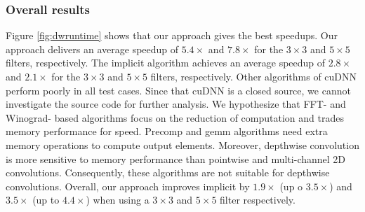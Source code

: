 \subsubsection{Overall results}
Figure \ref{fig:dwruntime} shows that our approach gives the best speedups. 
Our approach delivers an average speedup of $5.4\times$ and $7.8\times$ for the $3 \times 3$ and $5 \times 5$ filters, respectively. 
The implicit algorithm achieves an average speedup of $2.8\times$ and $2.1\times$ for the $3 \times 3$ and $5 \times 5$ filters, respectively.
Other algorithms of cuDNN perform poorly in all test cases. 
Since that cuDNN is a closed source, we cannot investigate the source code for further analysis. 
We hypothesize that FFT- and Winograd- based algorithms focus on the reduction of computation and trades memory performance for speed. 
Precomp and gemm algorithms need extra memory operations to compute output elements. 
Moreover, depthwise convolution is more sensitive to memory performance than pointwise and multi-channel 2D convolutions. 
Consequently, these algorithms are not suitable for depthwise convolutions. 
Overall, our approach improves implicit by $1.9\times$ (up o $3.5\times$) and $3.5\times$ (up to $4.4\times$) when using a $3 \times 3$ and $5 \times 5$ filter respectively.
